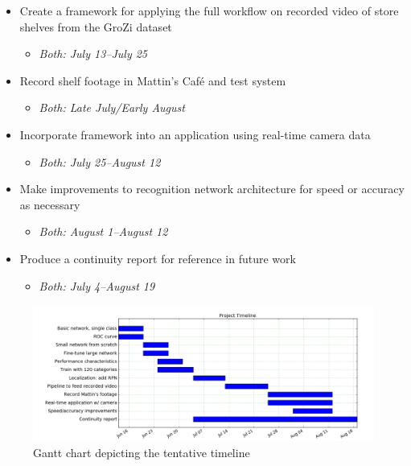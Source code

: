 \documentclass{article}
\begin{document}
\begin{itemize}
	\item Create a framework for applying the full workflow on recorded video of store shelves from the GroZi dataset
	\begin{itemize}
		\item \textit{Both: July 13--July 25}
	\end{itemize}

	\item Record shelf footage in Mattin's Café and test system
	\begin{itemize}
		\item \textit{Both: Late July/Early August}
	\end{itemize}

	\item Incorporate framework into an application using real-time camera data
	\begin{itemize}
		\item \textit{Both: July 25--August 12}
	\end{itemize}

	\item Make improvements to recognition network architecture for speed or accuracy as necessary
	\begin{itemize}
		\item \textit{Both: August 1--August 12}
	\end{itemize}

	\item Produce a continuity report for reference in future work
	\begin{itemize}
		\item \textit{Both: July 4--August 19}
	\end{itemize}

\end{itemize}

\begin{figure}[h]
	\caption{Gantt chart depicting the tentative timeline}
	\includegraphics[width=\textwidth]{gantt.png}
\end{figure}

\newpage


\end{document}
